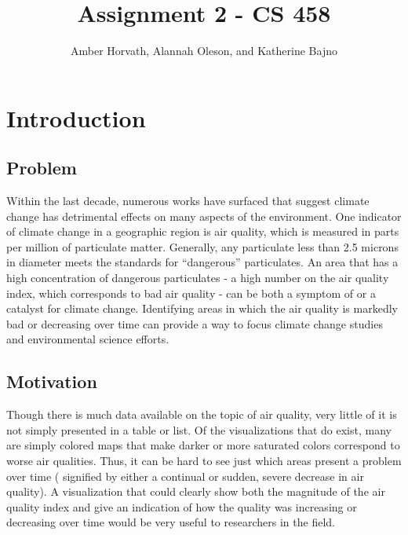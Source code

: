 \documentclass[journal]{vgtc}                %
\title{Assignment 2 - CS 458}
\author{Amber Horvath, Alannah Oleson, and Katherine Bajno}
\begin{document}


\maketitle


\section{Introduction} %

\subsection{Problem}
Within the last decade, numerous works have surfaced that suggest climate change has detrimental effects on many 
aspects of the environment. One indicator of climate change in a geographic region is air quality, which is measured 
in parts per million of particulate matter. Generally, any particulate less than 2.5 microns in diameter meets the 
standards for “dangerous” particulates. An area that has a high concentration of dangerous particulates - a high 
number on the air quality index, which corresponds to bad air quality - can be both a symptom of or a catalyst for 
climate change. Identifying areas in which the air quality is markedly bad or decreasing over time can provide a way 
to focus climate change studies and environmental science efforts.

\subsection{Motivation}
Though there is much data available on the topic of air quality, very little of it is not simply presented in a table 
or list. Of the visualizations that do exist, many are simply colored maps that make darker or more saturated colors 
correspond to worse air qualities. Thus, it can be hard to see just which areas present a problem over time (
signified by either a continual or sudden, severe decrease in air quality). A visualization that could clearly show 
both the magnitude of the air quality index and give an indication of how the quality was increasing or decreasing 
over time would be very useful to researchers in the field.
\end{document}

